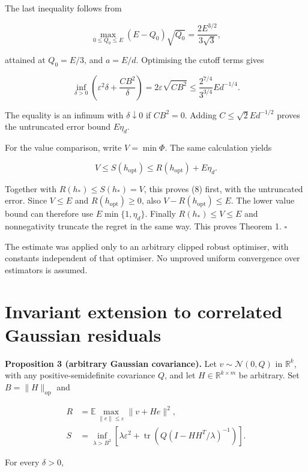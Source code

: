 \documentclass[11pt,a4paper]{article}
\begin{document}
The last inequality follows from

\[
\max_{0\le Q_0\le E}(E-Q_0)\sqrt{Q_0}
=\frac{2E^{3/2}}{3\sqrt3},
\]

attained at \(Q_0=E/3\), and \(a=E/d\). Optimising the cutoff terms
gives

\[
\inf_{\delta>0}\left(\varepsilon^2\delta+\frac{CB^2}{\delta}\right)
=2\varepsilon\sqrt{CB^2}
\le\frac{2^{7/4}}{3^{3/4}}E d^{-1/4}.
\tag{26}
\]

The equality is an infimum with \(\delta\downarrow0\) if \(CB^2=0\).
Adding \(C\le\sqrt2E d^{-1/2}\) proves the untruncated error bound
\(E\eta_d\).

For the value comparison, write \(V=\min\Phi\). The same calculation
yields

\[
V\le S(h_{\mathrm{opt}})
\le R(h_{\mathrm{opt}})+E\eta_d.
\]

Together with \(R(h_*)\le S(h_*)=V\), this proves (8) first, with the
untruncated error. Since \(V\le E\) and \(R(h_{\mathrm{opt}})\ge0\),
also \(V-R(h_{\mathrm{opt}})\le E\). The lower value bound can therefore
use \(E\min\{1,\eta_d\}\). Finally \(R(h_*)\le V\le E\) and
nonnegativity truncate the regret in the same way. This proves Theorem
1. \(\square\)

The estimate was applied only to an arbitrary clipped robust optimiser,
with constants independent of that optimiser. No unproved uniform
convergence over estimators is assumed.

\hypertarget{invariant-extension-to-correlated-gaussian-residuals}{%
\section{Invariant extension to correlated Gaussian
residuals}\label{invariant-extension-to-correlated-gaussian-residuals}}

\textbf{Proposition 3 (arbitrary Gaussian covariance).} Let
\(v\sim\mathcal N(0,Q)\) in \(\mathbb R^k\), with any
positive-semidefinite covariance \(Q\), and let
\(H\in\mathbb R^{k\times m}\) be arbitrary. Set
\(B=\|H\|_{\mathrm{op}}\) and

\[
\begin{aligned}
R&=\mathbb E\max_{\|e\|\le\varepsilon}\|v+He\|^2,\\
S&=\inf_{\lambda>B^2}
\left[
\lambda\varepsilon^2+
\operatorname{tr}\!\left(Q(I-HH^T/\lambda)^{-1}\right)
\right].
\end{aligned}
\]

For every \(\delta>0\),
\end{document}
